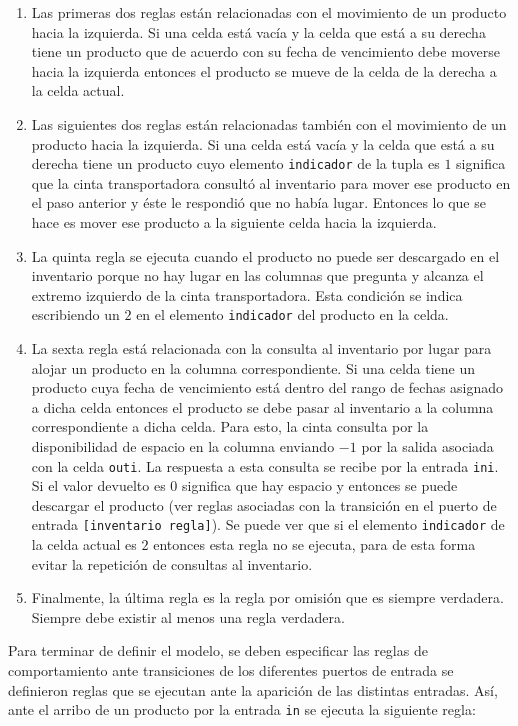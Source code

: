 \documentclass[10pt]{article}
\begin{document}
\begin{enumerate}
	\item Las primeras dos reglas están relacionadas con el movimiento de un producto hacia la izquierda. Si una celda está vacía y la celda que está a su derecha tiene un producto que de acuerdo con su fecha de vencimiento debe moverse hacia la izquierda entonces el producto se mueve de la celda de la derecha a la celda actual.
	\item Las siguientes dos reglas están relacionadas también con el movimiento de un producto hacia la izquierda. Si una celda está vacía y la celda que está a su derecha tiene un producto cuyo elemento \texttt{indicador} de la tupla es $1$ significa que la cinta transportadora consultó al inventario para mover ese producto en el paso anterior y éste le respondió que no había lugar. Entonces lo que se hace es mover ese producto a la siguiente celda hacia la izquierda.
	\item La quinta regla se ejecuta cuando el producto no puede ser descargado en el inventario porque no hay lugar en las columnas que pregunta y alcanza el extremo izquierdo de la cinta transportadora. Esta condición se indica escribiendo un $2$ en el elemento \texttt{indicador} del producto en la celda.
	\item La sexta regla está relacionada con la consulta al inventario por lugar para alojar un producto en la columna correspondiente. Si una celda tiene un producto cuya fecha de vencimiento está dentro del rango de fechas asignado a dicha celda entonces el producto se debe pasar al inventario a la columna correspondiente a dicha celda. Para esto, la cinta consulta por la disponibilidad de espacio en la columna enviando $-1$ por la salida asociada con la celda \texttt{outi}. La respuesta a esta consulta se recibe por la entrada \texttt{ini}. Si el valor devuelto es $0$ significa que hay espacio y entonces se puede descargar el producto (ver reglas asociadas con la transición en el puerto de entrada \texttt{[inventario regla]}). Se puede ver que si el elemento \texttt{indicador} de la celda actual es $2$ entonces esta regla no se ejecuta, para de esta forma evitar la repetición de consultas al inventario.
	\item Finalmente, la última regla es la regla por omisión que es siempre verdadera. Siempre debe existir al menos una regla verdadera.
\end{enumerate}

Para terminar de definir el modelo, se deben especificar las reglas de comportamiento ante transiciones de los diferentes puertos de entrada se definieron reglas que se ejecutan ante la aparición de las distintas entradas. Así, ante el arribo de un producto por la entrada \texttt{in} se ejecuta la siguiente regla:
\end{document}
